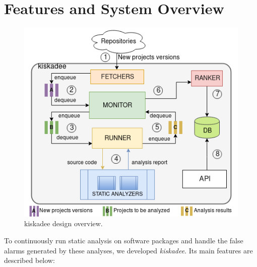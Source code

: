 \section{Features and System Overview}
\label{sec:system_overview}

\begin{figure}[hbt]
\centering
\includegraphics[width=.75\textwidth]{figures/kiskadee-overview.png}
  \caption{kiskadee design overview.}\label{fig:kiskadee:overview}
\end{figure}

To continuously run static analysis on software packages and handle the false
alarms generated by these analyses, we developed \textit{kiskadee}. Its main features are described below:

